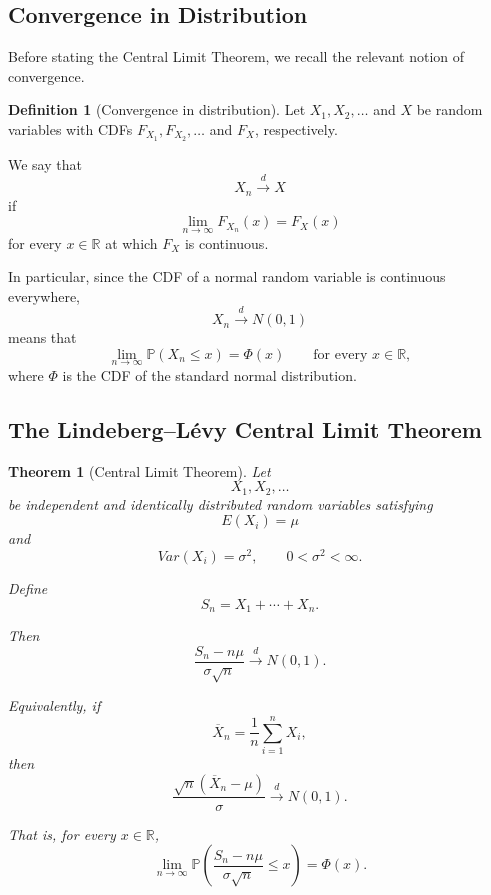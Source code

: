 \documentclass[11pt]{article}
\newcommand{\Prob}{\mathbb{P}}
\theoremstyle{definition}
\newtheorem{definition}{Definition}
\theoremstyle{plain}
\newtheorem{theorem}{Theorem}
\theoremstyle{remark}
\begin{document}
\subsection*{Convergence in Distribution}

Before stating the Central Limit Theorem, we recall the relevant notion
of convergence.

\begin{definition}[Convergence in distribution]
Let $X_1,X_2,\ldots$ and $X$ be random variables with CDFs
$F_{X_1},F_{X_2},\ldots$ and $F_X$, respectively.

We say that
\[
X_n \xrightarrow{d} X
\]
if
\[
\lim_{n\to\infty}F_{X_n}(x)
=
F_X(x)
\]
for every $x\in\mathbb{R}$ at which $F_X$ is continuous.
\end{definition}

In particular, since the CDF of a normal random variable is continuous
everywhere,
\[
X_n\xrightarrow{d}N(0,1)
\]
means that
\[
\lim_{n\to\infty}\Prob(X_n\le x)
=
\Phi(x)
\qquad
\text{for every }x\in\mathbb{R},
\]
where $\Phi$ is the CDF of the standard normal distribution.


\subsection*{The Lindeberg--L\'evy Central Limit Theorem}

\begin{theorem}[Central Limit Theorem]
\label{thm:clt}
Let
\[
X_1,X_2,\ldots
\]
be independent and identically distributed random variables satisfying
\[
E(X_i)=\mu
\]
and
\[
Var(X_i)=\sigma^2,
\qquad
0<\sigma^2<\infty.
\]

Define
\[
S_n=X_1+\cdots+X_n.
\]

Then
\[
\frac{S_n-n\mu}{\sigma\sqrt{n}}
\xrightarrow{d}
N(0,1).
\]

Equivalently, if
\[
\overline{X}_n
=
\frac{1}{n}\sum_{i=1}^n X_i,
\]
then
\[
\frac{\sqrt{n}(\overline{X}_n-\mu)}{\sigma}
\xrightarrow{d}
N(0,1).
\]

That is, for every $x\in\mathbb{R}$,
\[
\lim_{n\to\infty}
\Prob\left(
\frac{S_n-n\mu}{\sigma\sqrt{n}}
\le x
\right)
=
\Phi(x).
\]
\end{theorem}
\end{document}
